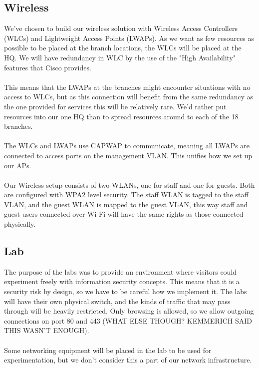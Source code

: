 \subsection{Wireless}


We've chosen to build our wireless solution with Wireless Access Controllers (WLCs) and Lightweight Access Points (LWAPs). As we want as few resources as possible to be placed at the branch locations, the WLCs will be placed at the HQ. We will have redundancy in WLC by the use of the "High Availability" features that Cisco provides.
\\
\\
This means that the LWAPs at the branches might encounter situations with no access to WLCs, but as this connection will benefit from the same redundancy as the one provided for services this will be relatively rare. We'd rather put resources into our one HQ than to spread resources around to each of the 18 branches.
\\
\\
The WLCs and LWAPs use CAPWAP to communicate, meaning all LWAPs are connected to access ports on the management VLAN. This unifies how we set up our APs.
\\
\\
Our Wireless setup consists of two WLANs, one for staff and one for guests. Both are configured with WPA2 level security. The staff WLAN is tagged to the staff VLAN, and the guest WLAN is mapped to the guest VLAN, this way staff and guest users connected over Wi-Fi will have the same rights as those connected physically.

\subsection{Lab}


The purpose of the labs was to provide an environment where visitors could experiment freely with information security concepts. This means that it is a security risk by design, so we have to be careful how we implement it. The labs will have their own physical switch, and the kinds of traffic that may pass through will be heavily restricted. Only browsing is allowed, so we allow outgoing connections on port 80 and 443 (WHAT ELSE THOUGH? KEMMERICH SAID THIS WASN'T ENOUGH). 
\\
\\
Some networking equipment will be placed in the lab to be used for experimentation, but we don't consider this a part of our network infrastructure.


